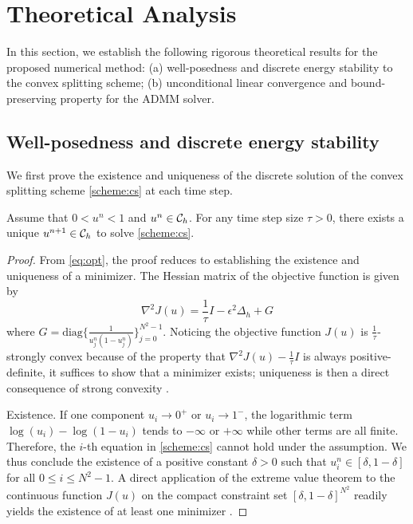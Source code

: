 \section{Theoretical Analysis}
\label{section:analysis}
In this section, we establish the following rigorous theoretical results for the proposed numerical method: 
(a) well-posedness and discrete energy stability to the convex splitting scheme;
(b) unconditional linear convergence and bound-preserving property for the ADMM solver.
\subsection{Well-posedness and discrete energy stability}
We first prove the existence and uniqueness of the discrete solution of the convex splitting scheme 
\eqref{scheme:cs} at each time step.
\begin{theorem}\label{thm:well-posedness}
    Assume that $0<u^n<1$ and $u^n \in {\mathcal{C}_h}$. For any time step size $\tau>0$, there exists a unique $u^{n+1}\in {\mathcal{C}_h}$ to solve \eqref{scheme:cs}.
\end{theorem}
\begin{proof}
    From \eqref{eq:opt}, the proof reduces to establishing the existence and uniqueness of a minimizer. 
    The Hessian matrix of the objective function is given by
    \begin{equation}
        \nabla^2 J(u)=\frac{1}{\tau}I-\epsilon^2\Delta_h+G
    \end{equation}
    where $G=\text{diag}\{
    \frac{1}{u_j^n(1-u_j^n)}\}_{j=0}^{N^2-1}$. 
    Noticing the objective function $J(u)$ is $\frac{1}{\tau}$-strongly convex because of the property that $\nabla^2J(u)-\frac{1}{\tau}I$ is always positive-definite, 
    it suffices to show that a minimizer exists; uniqueness is then a direct consequence of strong convexity \cite{boyd2004convex}.
    \par Existence. If one component $u_i\to 0^+$ or $u_i \to 1^-$, the logarithmic term $\log(u_i)-\log(1-u_i)$ tends to $-\infty$ or $+\infty$ while other terms are all finite. 
    Therefore, the $i$-th equation in \eqref{scheme:cs} cannot hold under the assumption. 
    We thus conclude the existence of a positive constant $\delta>0$ such that $u_i^n\in[\delta,1-\delta]$ for all $0\leq i\leq N^2-1$. 
    A direct application of the extreme value theorem to the continuous function $J(u)$ on the compact constraint set $[\delta,1-\delta]^{N^2}$ 
    readily yields the existence of at least one minimizer \cite{1976Principles,weierstrass1894mathematische}.
\end{proof}


